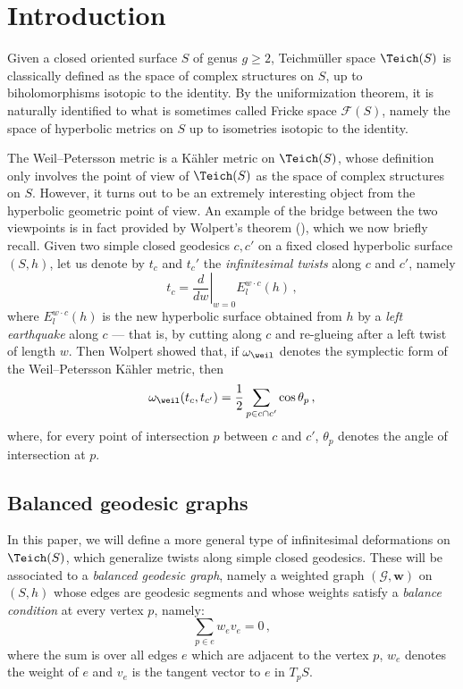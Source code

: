 \section{Introduction}

Given a closed oriented surface $S$ of genus $g\geq 2$, Teichm\"uller space $\Teich(S)$ is classically defined as the space of complex structures on $S$, up to biholomorphisms isotopic to the identity. By the uniformization theorem, it is naturally identified to what is sometimes called Fricke space $\mathcal F(S)$, namely the space of hyperbolic metrics on $S$ up to isometries isotopic to the identity.

The Weil--Petersson metric is a K\"ahler metric on $\Teich(S)$, whose definition only involves the point of view of $\Teich(S)$ as the space of complex structures on $S$. However, it turns out to be an extremely interesting object from the hyperbolic geometric point of view. An example of the bridge between the two viewpoints is in fact provided by Wolpert's theorem (\cite{wolpertelementary,wolpertformula}), which we now briefly recall. Given two simple closed geodesics $c,c'$ on a fixed closed hyperbolic surface $(S,h)$, let us denote by $t_c$ and $t_c'$ the \emph{infinitesimal twists} along $c$ and $c'$, namely
\[
t_c=\left.\frac{d}{dw}\right|_{w=0}E_l^{w\cdot c}(h)\,,
\]
where $E_l^{w\cdot c}(h)$ is the new hyperbolic surface obtained from $h$ by a \emph{left earthquake} along $c$ --- that is, by cutting along $c$ and re-glueing after a left twist of length $w$. Then Wolpert showed that, if $\omega_\weil$ denotes the symplectic form of the Weil--Petersson K\"ahler metric, then
\begin{equation}\label{eq wolpert formula}
\omega_\weil(t_{c},t_{c'})=\frac{1}{2}\sum_{p\in c\cap c'}\cos \theta_p\,,
\end{equation}
where, for every point of intersection $p$ between $c$ and $c'$, $\theta_p$ denotes the angle of intersection at $p$.


\subsection{Balanced geodesic graphs}

In this paper, we will define a more general type of infinitesimal deformations on $\Teich(S)$, which generalize twists along simple closed geodesics. These will be associated to a \emph{balanced geodesic graph}, namely a weighted graph $(\mathcal G,\mathbf w)$ on $(S,h)$ whose edges are geodesic segments and whose weights satisfy a \emph{balance condition} at every vertex $p$, namely:
\begin{equation}\label{eq balance intro}
{\sum_{p\in e} w_{e} v_{e}}=0\,,
\end{equation}
where the sum is over all edges $e$ which are adjacent to the vertex $p$, $w_e$ denotes the weight of $e$ and $v_e$ is the tangent vector to $e$ in $T_p S$.

